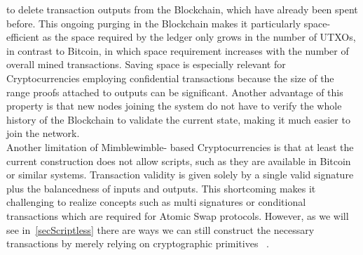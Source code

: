 to delete transaction outputs from the Blockchain, which have already been spent before. This ongoing purging in the Blockchain makes it particularly space-efficient as the
space required by the ledger only grows in the number of UTXOs, in contrast to Bitcoin, in which space requirement increases with the number of overall mined transactions.
Saving space is especially relevant for Cryptocurrencies employing confidential transactions because the size of the range proofs attached to outputs can be significant.
Another advantage of this property is that new nodes joining the system do not have to verify the whole history of the Blockchain to validate the current state, making it much easier to join the network. \\
Another limitation of Mimblewimble- based Cryptocurrencies is that at least the current construction does not allow scripts, such as they are available in Bitcoin or similar systems.
Transaction validity is given solely by a single valid signature plus the balancedness of inputs and outputs.
This shortcoming makes it challenging to realize concepts such as multi signatures or conditional transactions which are required for Atomic Swap protocols. However,
as we will see in~\ref{secScriptless} there are ways we can still construct the necessary transactions by merely relying on cryptographic primitives ~\cite{fuchsbauer2019aggregate}.

